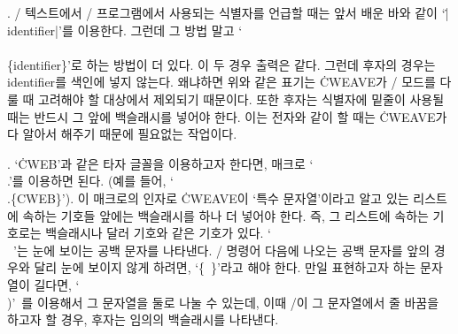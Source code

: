 {%
. \TEX/ 텍스트에서 \CEE/ 프로그램에서 사용되는 식별자를  언급할 때는 앞서
배운 바와 같이 `\.{|identifier|}'를 이용한다. 그런데 그 방법 말고
`\.{\\\\\{identifier\}}'로 하는 방법이 더 있다. 이 두 경우 출력은 같다. 그런데
후자의 경우는 \\{identifier}를 색인에 넣지 않는다. 왜냐하면 위와 같은 표기는
\.{CWEAVE}가 \CEE/ 모드를 다룰 때 고려해야 할 대상에서 제외되기 때문이다. 또한
후자는 식별자에 밑줄이 사용될 때는 반드시 그 앞에 백슬래시를 넣어야 한다. 이는
전자와 같이 할 때는 \.{CWEAVE}가 다 알아서 해주기 때문에 필요없는 작업이다.

. `\.{CWEB}'과 같은 타자 글꼴을 이용하고자 한다면, 매크로 `\.{\\.}'를
이용하면 된다. (예를 들어, `\.{\\.\{CWEB\}}'). 이 매크로의 인자로 \.{CWEAVE}이
`특수 문자열'이라고 알고 있는 리스트에 속하는 기호들 앞에는 백슬래시를 하나 더
넣어야 한다. 즉, 그 리스트에 속하는 기호로는 백슬래시나 달러 기호와 같은 기호가
있다. `\.{\\\ }'는 눈에 보이는 공백 문자를 나타낸다. \TEX/ 명령어 다음에 나오는
공백 문자를 앞의 경우와 달리 눈에 보이지 않게 하려면, `\.{\{\ \}}'라고 해야 한다.
만일 표현하고자 하는 문자열이 길다면, `\.{\\)}'\, 를 이용해서 그 문자열을 둘로
나눌 수 있는데, 이때 \TEX/이 그 문자열에서 줄 바꿈을 하고자 할 경우, 후자는
임의의 백슬래시를 나타낸다.

}
